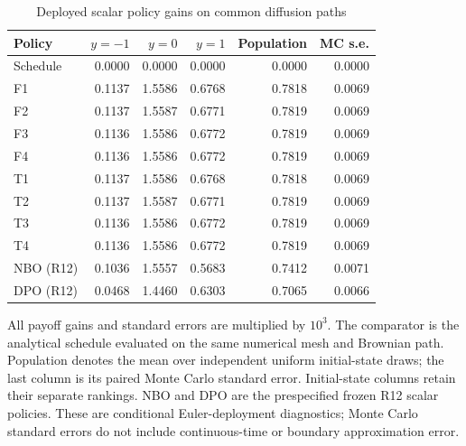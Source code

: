 \begin{table}[!htbp]
\centering\small
\caption{Deployed scalar policy gains on common diffusion paths}
\label{tab:r15scalardeployment}
\begin{tabular}{lrrrrr}
\toprule
Policy & $y=-1$ & $y=0$ & $y=1$ & Population & MC s.e. \\
\midrule
Schedule & 0.0000 & 0.0000 & 0.0000 & 0.0000 & 0.0000 \\
F1 & 0.1137 & 1.5586 & 0.6768 & 0.7818 & 0.0069 \\
F2 & 0.1137 & 1.5587 & 0.6771 & 0.7819 & 0.0069 \\
F3 & 0.1136 & 1.5586 & 0.6772 & 0.7819 & 0.0069 \\
F4 & 0.1136 & 1.5586 & 0.6772 & 0.7819 & 0.0069 \\
T1 & 0.1137 & 1.5586 & 0.6768 & 0.7818 & 0.0069 \\
T2 & 0.1137 & 1.5587 & 0.6771 & 0.7819 & 0.0069 \\
T3 & 0.1136 & 1.5586 & 0.6772 & 0.7819 & 0.0069 \\
T4 & 0.1136 & 1.5586 & 0.6772 & 0.7819 & 0.0069 \\
NBO (R12) & 0.1036 & 1.5557 & 0.5683 & 0.7412 & 0.0071 \\
DPO (R12) & 0.0468 & 1.4460 & 0.6303 & 0.7065 & 0.0066 \\
\bottomrule
\end{tabular}
\par\medskip\noindent\footnotesize All payoff gains and standard errors are multiplied by $10^3$. The comparator is the analytical schedule evaluated on the same numerical mesh and Brownian path. Population denotes the mean over independent uniform initial-state draws; the last column is its paired Monte Carlo standard error. Initial-state columns retain their separate rankings. NBO and DPO are the prespecified frozen R12 scalar policies. These are conditional Euler-deployment diagnostics; Monte Carlo standard errors do not include continuous-time or boundary approximation error.
\end{table}
